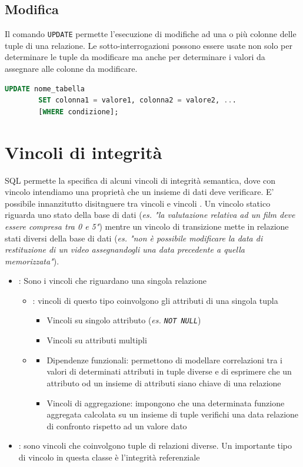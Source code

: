 \documentclass[12pt, a4paper]{report}
\begin{document}
    \subsection{Modifica}
    Il comando \texttt{UPDATE} permette l'esecuzione di modifiche ad una o più colonne delle tuple di una relazione. Le sotto-interrogazioni possono essere usate non solo per determinare le tuple da modificare ma anche per determinare i valori da assegnare alle colonne da modificare.
    \begin{lstlisting}[language=SQL]
        UPDATE nome_tabella
        SET colonna1 = valore1, colonna2 = valore2, ...
        [WHERE condizione];
    \end{lstlisting}
    \section{Vincoli di integrità}
    SQL permette la specifica di alcuni vincoli di integrità semantica, dove con vincolo intendiamo una proprietà che un insieme di dati deve verificare. E' possibile innanzitutto disitnguere tra vincoli  e vincoli . Un vincolo statico riguarda uno stato della base di dati (\textit{es. "la valutazione relativa ad un film deve essere compresa tra 0 e 5"}) mentre un vincolo di transizione mette in relazione stati diversi della base di dati (\textit{es. "non è possibile modificare la data di restituzione di un video assegnandogli una data precedente a quella memorizzata"}).
    \begin{itemize}
        \item {}: Sono i vincoli che riguardano una singola relazione \begin{itemize}
            \item {}: vincoli di questo tipo coinvolgono gli attributi di una singola tupla \begin{itemize}
                \item Vincoli su singolo attributo (\textit{es. \texttt{NOT NULL}})
                \item Vincoli su attributi multipli
            \end{itemize}
            \item {} \begin{itemize}
                \item Dipendenze funzionali: permettono di modellare correlazioni tra i valori di determinati attributi in tuple diverse e di esprimere che un attributo od un insieme di attributi siano chiave di una relazione
                \item Vincoli di aggregazione: impongono che una determinata funzione aggregata calcolata su un insieme di tuple verifichi una data relazione di confronto rispetto ad un valore dato
            \end{itemize}
        \end{itemize}
        \item {}: sono vincoli che coinvolgono tuple di relazioni diverse. Un importante tipo di vincolo in questa classe è l'integrità referenziale
    \end{itemize}
\end{document}
